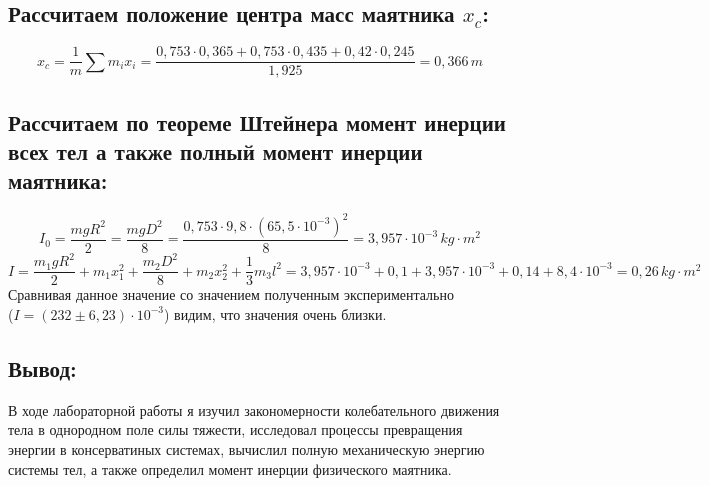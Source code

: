 \documentclass[a4paper,12pt]{report}
\begin{document}
\subsection*{Рассчитаем положение центра масс маятника $x_c$:}

\[ x_c = \frac{1}{m}\sum m_i x_i = \frac{0,753\cdot 0,365 + 0,753\cdot 0,435 + 0,42 \cdot 0,245 }{1,925} = 0,366 \, m \]

\subsection*{Рассчитаем по теореме Штейнера момент инерции всех тел а также полный момент инерции маятника:}

\[ I_0 = \frac{mgR^2}{2} = \frac{mgD^2}{8} = \frac{0,753 \cdot 9,8 \cdot (65,5 \cdot 10^{-3})^2}{8} = 3,957 \cdot 10^{-3} \, kg\cdot m^2 \]
\[ I = \frac{m_1gR^2}{2} + m_1x_1^2 + \frac{m_2D^2}{8} + m_2x_2^2 + \frac{1}{3}m_3l^2 = 3,957\cdot 10^{-3} + 0,1 + 3,957\cdot 10^{-3} + 0,14 + 8,4\cdot 10^{-3} = 0,26 \, kg\cdot m^2\]
Сравнивая данное значение со значением полученным экспериментально\\
($I = (232\pm6,23)\cdot 10^{-3}$) видим, что значения очень близки.

\subsection*{Вывод:}
В ходе лабораторной работы я изучил закономерности колебательного движения тела в однородном поле силы тяжести, исследовал процессы превращения энергии в консерватиных системах, вычислил полную механическую энергию системы тел, а также определил момент инерции физического маятника.
\end{document}
